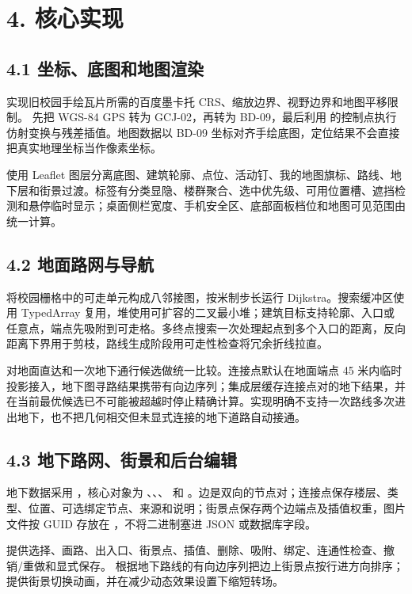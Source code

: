 \documentclass[UTF8,a4paper,12pt]{ctexart}
\begin{document}
\section{4. 核心实现}
\subsection{4.1 坐标、底图和地图渲染}
\texttt{} 实现旧校园手绘瓦片所需的百度墨卡托 CRS、缩放边界、视野边界和地图平移限制。\texttt{} 先把 WGS-84 GPS 转为 GCJ-02，再转为 BD-09，最后利用 \texttt{} 的控制点执行仿射变换与残差插值。地图数据以 BD-09 坐标对齐手绘底图，定位结果不会直接把真实地理坐标当作像素坐标。\par
\texttt{} 使用 Leaflet 图层分离底图、建筑轮廓、点位、活动钉、我的地图旗标、路线、地下层和街景过渡。标签有分类显隐、楼群聚合、选中优先级、可用位置槽、遮挡检测和悬停临时显示；桌面侧栏宽度、手机安全区、底部面板档位和地图可见范围由 \texttt{} 统一计算。\par
\subsection{4.2 地面路网与导航}
\texttt{} 将校园栅格中的可走单元构成八邻接图，按米制步长运行 Dijkstra。搜索缓冲区使用 TypedArray 复用，堆使用可扩容的二叉最小堆；建筑目标支持轮廓、入口或任意点，端点先吸附到可走格。多终点搜索一次处理起点到多个入口的距离，反向距离下界用于剪枝，路线生成阶段用可走性检查将冗余折线拉直。\par
\texttt{} 对地面直达和一次地下通行候选做统一比较。连接点默认在地面端点 45 米内临时投影接入，地下图寻路结果携带有向边序列；集成层缓存连接点对的地下结果，并在当前最优候选已不可能被超越时停止精确计算。实现明确不支持一次路线多次进出地下，也不把几何相交但未显式连接的地下道路自动接通。\par
\subsection{4.3 地下路网、街景和后台编辑}
地下数据采用 \texttt{}，核心对象为 \texttt{}、\texttt{}、\texttt{}、\texttt{} 和 \texttt{}。边是双向的节点对；连接点保存楼层、类型、位置、可选绑定节点、来源和说明；街景点保存两个边端点及插值权重，图片文件按 GUID 存放在 \texttt{}，不将二进制塞进 JSON 或数据库字段。\par
\texttt{} 提供选择、画路、出入口、街景点、插值、删除、吸附、绑定、连通性检查、撤销/重做和显式保存。\texttt{} 根据地下路线的有向边序列把边上街景点按行进方向排序；\texttt{} 提供街景切换动画，并在减少动态效果设置下缩短转场。\par
\end{document}
